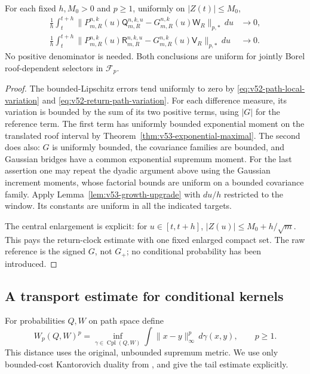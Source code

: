 \begin{theorem}
\label{thm:v53-unbounded-raw-paths}
For each fixed $h,M_0>0$ and $p\ge1$, uniformly on $|Z(t)|\le M_0$,
\begin{align}
 \frac1h\int_t^{t+h}
 \|P_{m,R}^{n,k}(u)\mathsf Q_{m,R}^{n,k,u}
                      -G_{m,R}^{n,k}(u)\mathsf W_R\|_{p,*}\,du&\to0,
                                      \label{eq:v53-unbounded-collision}\\
 \frac1h\int_t^{t+h}
 \|P_{m,R}^{n,k}(u)\mathsf R_{m,R}^{n,k,u}
                      -G_{m,R}^{n,k}(u)\mathsf V_R\|_{p,*}\,du&\to0.
                                      \label{eq:v53-unbounded-return}
\end{align}
No positive denominator is needed. Both conclusions are uniform for
jointly Borel roof-dependent selectors in $\mathcal F_p$.
\end{theorem}
\begin{proof}
The bounded-Lipschitz errors tend uniformly to zero by
\eqref{eq:v52-path-local-variation} and
\eqref{eq:v52-return-path-variation}. For each difference measure,
its variation is bounded by the sum of its two positive terms,
using $|G|$ for the reference term. The first term has uniformly
bounded exponential moment on the translated roof interval by
Theorem~\ref{thm:v53-exponential-maximal}. The second does also:
$G$ is uniformly bounded, the covariance families are bounded, and
Gaussian bridges have a common exponential supremum moment. For the
last assertion one may repeat the dyadic argument above using the
Gaussian increment moments, whose factorial bounds are uniform on a
bounded covariance family. Apply
Lemma~\ref{lem:v53-growth-upgrade} with $du/h$ restricted to the
window. Its constants are uniform in all the indicated targets.

The central enlargement is explicit: for $u\in[t,t+h]$,
$|Z(u)|\le M_0+h/\sqrt m$. This pays the return-clock estimate with
one fixed enlarged compact set. The raw reference is the signed
$G$, not $G_+$; no conditional probability has been introduced.
\end{proof}

\subsection{A transport estimate for conditional kernels}
For probabilities $Q,W$ on path space define
\[
 W_p(Q,W)^p=\inf_{\gamma\in\operatorname{Cpl}(Q,W)}
           \int\|x-y\|_\infty^p\,d\gamma(x,y),\qquad p\ge1.
\]
This distance uses the original, unbounded supremum metric. We use
only bounded-cost Kantorovich duality from \cite[Chapters 5--6]{Villani},
and give the tail estimate explicitly.

